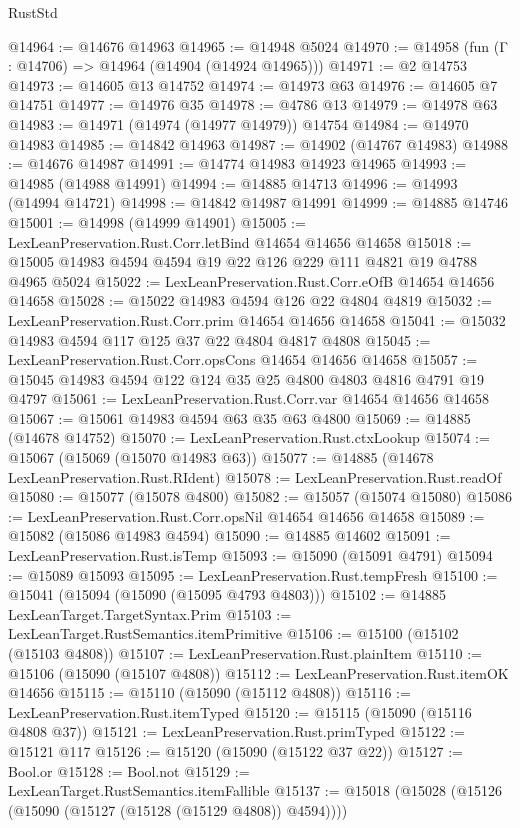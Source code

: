 \begin{lexlean}{RustStd}
\begin{coremodule}
@14964 := @14676 @14963
@14965 := @14948 @5024
@14970 := @14958 (fun (Γ : @14706) => @14964 (@14904 (@14924 @14965)))
@14971 := @2 @14753
@14973 := @14605 @13 @14752
@14974 := @14973 @63
@14976 := @14605 @7 @14751
@14977 := @14976 @35
@14978 := @4786 @13
@14979 := @14978 @63
@14983 := @14971 (@14974 (@14977 @14979)) @14754
@14984 := @14970 @14983
@14985 := @14842 @14963
@14987 := @14902 (@14767 @14983)
@14988 := @14676 @14987
@14991 := @14774 @14983 @14923 @14965
@14993 := @14985 (@14988 @14991)
@14994 := @14885 @14713
@14996 := @14993 (@14994 @14721)
@14998 := @14842 @14987 @14991
@14999 := @14885 @14746
@15001 := @14998 (@14999 @14901)
@15005 := LexLeanPreservation.Rust.Corr.letBind @14654 @14656 @14658
@15018 := @15005 @14983 @4594 @4594 @19 @22 @126 @229 @111 @4821 @19 @4788 @4965 @5024
@15022 := LexLeanPreservation.Rust.Corr.eOfB @14654 @14656 @14658
@15028 := @15022 @14983 @4594 @126 @22 @4804 @4819
@15032 := LexLeanPreservation.Rust.Corr.prim @14654 @14656 @14658
@15041 := @15032 @14983 @4594 @117 @125 @37 @22 @4804 @4817 @4808
@15045 := LexLeanPreservation.Rust.Corr.opsCons @14654 @14656 @14658
@15057 := @15045 @14983 @4594 @122 @124 @35 @25 @4800 @4803 @4816 @4791 @19 @4797
@15061 := LexLeanPreservation.Rust.Corr.var @14654 @14656 @14658
@15067 := @15061 @14983 @4594 @63 @35 @63 @4800
@15069 := @14885 (@14678 @14752)
@15070 := LexLeanPreservation.Rust.ctxLookup
@15074 := @15067 (@15069 (@15070 @14983 @63))
@15077 := @14885 (@14678 LexLeanPreservation.Rust.RIdent)
@15078 := LexLeanPreservation.Rust.readOf
@15080 := @15077 (@15078 @4800)
@15082 := @15057 (@15074 @15080)
@15086 := LexLeanPreservation.Rust.Corr.opsNil @14654 @14656 @14658
@15089 := @15082 (@15086 @14983 @4594)
@15090 := @14885 @14602
@15091 := LexLeanPreservation.Rust.isTemp
@15093 := @15090 (@15091 @4791)
@15094 := @15089 @15093
@15095 := LexLeanPreservation.Rust.tempFresh
@15100 := @15041 (@15094 (@15090 (@15095 @4793 @4803)))
@15102 := @14885 LexLeanTarget.TargetSyntax.Prim
@15103 := LexLeanTarget.RustSemantics.itemPrimitive
@15106 := @15100 (@15102 (@15103 @4808))
@15107 := LexLeanPreservation.Rust.plainItem
@15110 := @15106 (@15090 (@15107 @4808))
@15112 := LexLeanPreservation.Rust.itemOK @14656
@15115 := @15110 (@15090 (@15112 @4808))
@15116 := LexLeanPreservation.Rust.itemTyped
@15120 := @15115 (@15090 (@15116 @4808 @37))
@15121 := LexLeanPreservation.Rust.primTyped
@15122 := @15121 @117
@15126 := @15120 (@15090 (@15122 @37 @22))
@15127 := Bool.or
@15128 := Bool.not
@15129 := LexLeanTarget.RustSemantics.itemFallible
@15137 := @15018 (@15028 (@15126 (@15090 (@15127 (@15128 (@15129 @4808)) @4594))))

\end{coremodule}
\end{lexlean}
